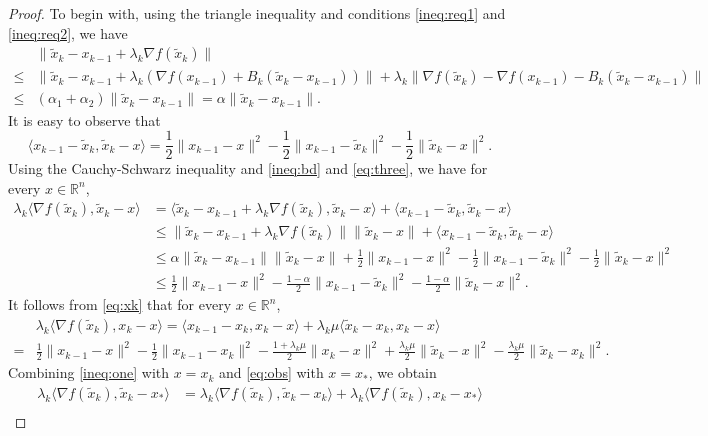 \documentclass[11pt]{article}
\newcommand{\R}{\mathbb{R}}
\newcommand{\inner}[2]{\langle #1,#2\rangle}
\newcommand{\tx}{\tilde x}
\begin{document}
\begin{proof}
	To begin with, using the triangle inequality and conditions \eqref{ineq:req1} and \eqref{ineq:req2}, we have
	\begin{align}
		& \|\tx_k - x_{k-1} + \lambda_k \nabla f(\tx_k)\| \nonumber \\
		\le & \|\tx_k - x_{k-1} + \lambda_k \left(\nabla f(x_{k-1}) + B_k(\tx_k - x_{k-1}) \right)\| + \lambda_k \|\nabla f(\tx_k) - \nabla f(x_{k-1}) - B_k (\tx_k - x_{k-1})\| \nonumber \\
		\le & (\alpha_1 + \alpha_2) \|\tx_k - x_{k-1}\| = \alpha \|\tx_k - x_{k-1}\|. \label{ineq:bd}
	\end{align}
	It is easy to observe that
	\begin{equation}\label{eq:three}
		\inner{x_{k-1} - \tx_k}{\tx_k - x} = \frac12 \|x_{k-1} - x\|^2 - \frac12 \|x_{k-1} - \tx_k\|^2 - \frac12 \|\tx_k - x\|^2.
	\end{equation}
	Using the Cauchy-Schwarz inequality and \eqref{ineq:bd} and \eqref{eq:three}, we have for every $x\in \R^n$,
	\begin{align}
		\lambda_k\inner{\nabla f(\tx_k)}{\tx_k - x} & = \inner{\tx_k - x_{k-1} + \lambda_k \nabla f(\tx_k)}{\tx_k - x} + \inner{x_{k-1} - \tx_k}{\tx_k - x} \nonumber \\
		&\le \|\tx_k - x_{k-1} + \lambda_k \nabla f(\tx_k)\| \|\tx_k - x\| + \inner{x_{k-1} - \tx_k}{\tx_k - x} \nonumber \\
		&\le \alpha \|\tx_k - x_{k-1}\| \|\tx_k - x\| + \frac12 \|x_{k-1} - x\|^2 - \frac12 \|x_{k-1} - \tx_k\|^2 - \frac12 \|\tx_k - x\|^2 \nonumber \\
		&\le \frac12 \|x_{k-1} - x\|^2 - \frac{1-\alpha}2 \|x_{k-1} - \tx_k\|^2 - \frac{1-\alpha}2 \|\tx_k - x\|^2. \label{ineq:one}
	\end{align}
	It follows from \eqref{eq:xk} that for every $x\in \R^n$,
	\begin{align}
		&\lambda_k\inner{\nabla f(\tx_k)}{x_k - x} = \inner{x_{k-1} - x_k}{x_k - x} + \lambda_k \mu \inner{\tx_k - x_k}{x_k - x} \nonumber \\
		=& \frac12\|x_{k-1} - x\|^2 - \frac12 \|x_{k-1} - x_k\|^2 - \frac{1+\lambda_k \mu}{2} \|x_k - x\|^2 + \frac{\lambda_k \mu}{2} \|\tx_k - x\|^2 - \frac{\lambda_k \mu}{2} \|\tx_k - x_k\|^2. \label{eq:obs}
	\end{align}
	Combining \eqref{ineq:one} with $x=x_k$ and \eqref{eq:obs} with $x=x_*$, we obtain
	\begin{align}
		\lambda_k\inner{\nabla f(\tx_k)}{\tx_k - x_*} & = \lambda_k\inner{\nabla f(\tx_k)}{\tx_k - x_k} + \lambda_k\inner{\nabla f(\tx_k)}{x_k - x_*} \nonumber \\ 

\end{align}
\end{proof}
\end{document}
